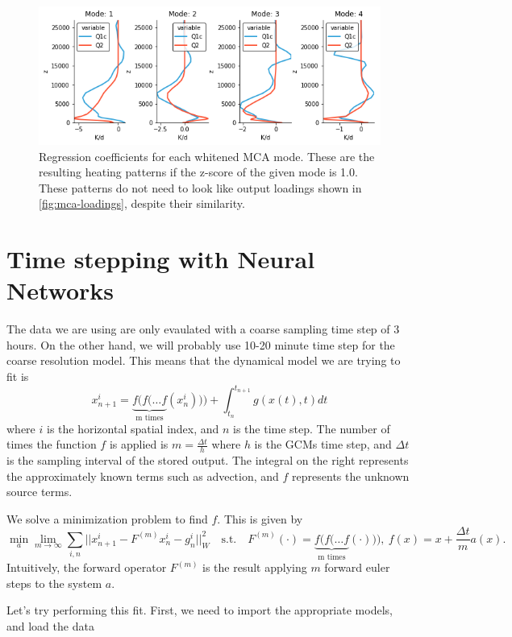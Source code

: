\documentclass{report}
\newcommand{\1}[1]{\mathds{1}\left[#1\right]}
\begin{document}
\begin{figure}[ht]
  \centering
  \includegraphics[width=5in]{images/mca-regression-coef}
  \caption{\label{fig:mca-regression-coef}Regression coefficients for each
    whitened MCA mode. 
    These are the resulting heating patterns if the z-score of the given mode is
    1.0. 
    These patterns do not need to look like output loadings shown in
    \autoref{fig:mca-loadings}, despite their similarity.}
\end{figure}

\section{Time stepping with Neural Networks}

The data we are using are only evaulated with a coarse sampling time step of 3 hours. On the other hand, we will probably use 10-20 minute time step for the coarse resolution model. This means that the dynamical model we are trying to fit is 
$$ x^i_{n+1} = \underbrace{f(f(\ldots f}_{\text{m times}}(x^i_n))) + \int_{t_n}^{t_{n+1}} g(x(t), t) dt$$ 
where $i$ is the horizontal spatial index, and $n$ is the time step. The number of times the function $f$ is applied is $m=\frac{\Delta t}{h}$ where $h$ is the GCMs time step, and $\Delta t$ is the sampling interval of the stored output. The integral on the right represents the approximately known terms such as advection, and $f$ represents the unknown source terms.

We solve a minimization problem to find $f$. This is given by 
$$
\min_{a} \lim_{m \rightarrow \infty} \sum_{i,n} ||x^{i}_{n+1} - F^{(m)} x^i_{n} - g_n^{i}||_W^2 \quad \text{s.t.}\quad F^{(m)}(\cdot) = \underbrace{f(f(\ldots f}_{\text{m times}}(\cdot))),\ f(x) = x +  \frac{ \Delta t}{m} a(x).
$$
Intuitively, the forward operator $F^{(m)}$ is the result applying $m$ forward euler steps to the system $a$.

Let's try performing this fit. First, we need to import the appropriate models, and load the data
\end{document}
